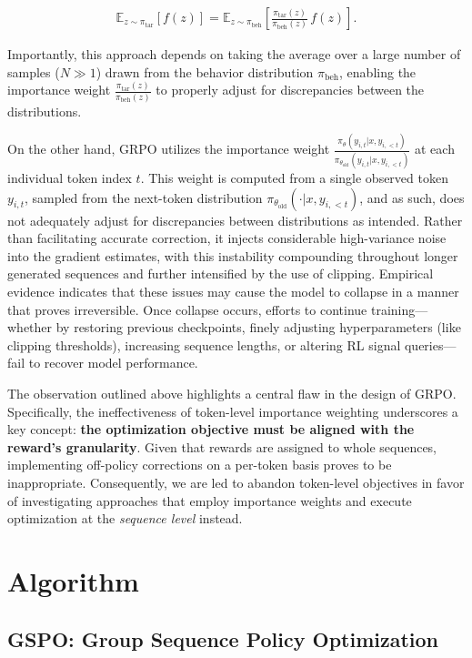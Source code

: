\begin{align}
\mathbb{E}_{z \sim \pi_\text{tar}} \left[ f(z) \right] = \mathbb{E}_{z \sim \pi_\text{beh}} \left[ \frac{ \pi_\text{tar} (z) }{ \pi_\text{beh} (z)} \, f(z) \right].
\end{align}

Importantly, this approach depends on taking the average over a large number of samples ($N \gg 1$) drawn from the behavior distribution $\pi_\text{beh}$, enabling the importance weight $\frac{ \pi_\text{tar} (z) }{ \pi_\text{beh} (z)}$ to properly adjust for discrepancies between the distributions.

On the other hand, GRPO utilizes the importance weight $\frac{ \pi_{\theta} (y_{i,t} | x, y_{i,<t}) }{ \pi_{\theta_\text{old}} (y_{i,t} | x,y_{i,<t})}$ at each individual token index $t$. This weight is computed from a single observed token $y_{i,t}$, sampled from the next-token distribution $\pi_{\theta_\text{old}}( \cdot | x, y_{i, <t})$, and as such, does not adequately adjust for discrepancies between distributions as intended. Rather than facilitating accurate correction, it injects considerable high-variance noise into the gradient estimates, with this instability compounding throughout longer generated sequences and further intensified by the use of clipping. Empirical evidence indicates that these issues may cause the model to collapse in a manner that proves irreversible. Once collapse occurs, efforts to continue training—whether by restoring previous checkpoints, finely adjusting hyperparameters (like clipping thresholds), increasing sequence lengths, or altering RL signal queries—fail to recover model performance.

The observation outlined above highlights a central flaw in the design of GRPO. Specifically, the ineffectiveness of token-level importance weighting underscores a key concept: \textbf{the optimization objective must be aligned with the reward's granularity}. Given that rewards are assigned to whole sequences, implementing off-policy corrections on a per-token basis proves to be inappropriate. Consequently, we are led to abandon token-level objectives in favor of investigating approaches that employ importance weights and execute optimization at the \textit{sequence level} instead.

\section{Algorithm}

\subsection{GSPO: Group Sequence Policy Optimization}

